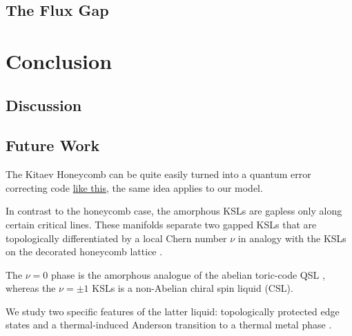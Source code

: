 \hypertarget{the-flux-gap}{%
\subsection{The Flux Gap}\label{the-flux-gap}}

\hypertarget{conclusion}{%
\section{Conclusion}\label{conclusion}}

\hypertarget{discussion}{%
\subsection{Discussion}\label{discussion}}

\hypertarget{future-work}{%
\subsection{Future Work}\label{future-work}}

The Kitaev Honeycomb can be quite easily turned into a quantum error
correcting code \href{https://errorcorrectionzoo.org/c/honeycomb}{like
this}, the same idea applies to our model.

In contrast to the honeycomb case, the amorphous KSLs are gapless only
along certain critical lines. These manifolds separate two gapped KSLs
that are topologically differentiated by a local Chern number \(\nu\)
\autocite{peru_preprint,mitchellAmorphousTopologicalInsulators2018} in
analogy with the KSLs on the decorated honeycomb lattice
\autocite{yaoExactChiralSpin2007}.

The \(\nu=0\) phase is the amorphous analogue of the abelian toric-code
QSL \autocite{kitaev_fault-tolerant_2003}, whereas the \(\nu=\pm1\) KSLs
is a non-Abelian chiral spin liquid (CSL).

We study two specific features of the latter liquid: topologically
protected edge states and a thermal-induced Anderson transition to a
thermal metal phase \autocite{selfThermallyInducedMetallic2019}.

